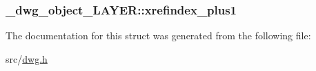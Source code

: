 \hypertarget{struct__dwg__object__LAYER_a60286e3efbbdc1eaea161e9683ad3c6e}{
\subsubsection[{xrefindex\-\_\-plus1}]{ {\bf \-\_\-dwg\-\_\-object\-\_\-\-L\-A\-Y\-E\-R\-::xrefindex\-\_\-plus1}}}\label{struct__dwg__object__LAYER_a60286e3efbbdc1eaea161e9683ad3c6e}


\-The documentation for this struct was generated from the following file\-:\begin{DoxyCompactItemize}
\item 
src/\hyperlink{dwg_8h}{dwg.\-h}\end{DoxyCompactItemize}
